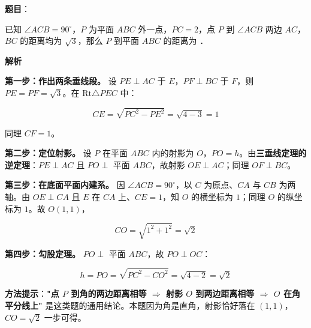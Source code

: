 \begin{answer}

\textbf{题目}：

已知 $\angle ACB=90^\circ$，$P$ 为平面 $ABC$ 外一点，$PC=2$，点 $P$ 到 $\angle ACB$ 两边 $AC$，$BC$ 的距离均为 $\sqrt3$，那么 $P$ 到平面 $ABC$ 的距离为 \gkblank{}．

\textbf{解析}

\textbf{第一步：作出两条垂线段。} 设 $PE\perp AC$ 于 $E$，$PF\perp BC$ 于 $F$，则 $PE=PF=\sqrt3$。在 $\mathrm{Rt}\triangle PEC$ 中：

\nopagebreak[4]
\[CE=\sqrt{PC^{2}-PE^{2}}=\sqrt{4-3}=1\]

同理 $CF=1$。

\textbf{第二步：定位射影。} 设 $P$ 在平面 $ABC$ 内的射影为 $O$，$PO=h$。由\textbf{三垂线定理的逆定理}：$PE\perp AC$ 且 $PO\perp$ 平面 $ABC$，故射影 $OE\perp AC$；同理 $OF\perp BC$。

\textbf{第三步：在底面平面内建系。} 因 $\angle ACB=90^\circ$，以 $C$ 为原点、$CA$ 与 $CB$ 为两轴。由 $OE\perp CA$ 且 $E$ 在 $CA$ 上、$CE=1$，知 $O$ 的横坐标为 $1$；同理 $O$ 的纵坐标为 $1$。故 $O(1,1)$，

\nopagebreak[4]
\[CO=\sqrt{1^{2}+1^{2}}=\sqrt2\]

\textbf{第四步：勾股定理。} $PO\perp$ 平面 $ABC$，故 $PO\perp OC$：

\nopagebreak[4]
\[h=PO=\sqrt{PC^{2}-CO^{2}}=\sqrt{4-2}=\sqrt2\]

\begin{gktip}
\textbf{方法提示}：\textbf{"点 $P$ 到角的两边距离相等 $\Rightarrow$ 射影 $O$ 到两边距离相等 $\Rightarrow$ $O$ 在角平分线上"} 是这类题的通用结论。本题因为角是直角，射影恰好落在 $(1,1)$，$CO=\sqrt2$ 一步可得。
\end{gktip}


\par\medskip

\end{answer}

